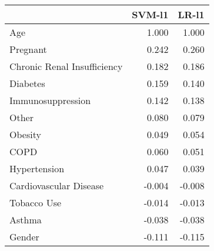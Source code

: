 \begin{tabular}{lrr}
\toprule
{} &  SVM-l1 &  LR-l1 \\
\midrule
Age                         &   1.000 &  1.000 \\
Pregnant                    &   0.242 &  0.260 \\
Chronic Renal Insufficiency &   0.182 &  0.186 \\
Diabetes                    &   0.159 &  0.140 \\
Immunosuppression           &   0.142 &  0.138 \\
Other                       &   0.080 &  0.079 \\
Obesity                     &   0.049 &  0.054 \\
COPD                        &   0.060 &  0.051 \\
Hypertension                &   0.047 &  0.039 \\
Cardiovascular Disease      &  -0.004 & -0.008 \\
Tobacco Use                 &  -0.014 & -0.013 \\
Asthma                      &  -0.038 & -0.038 \\
Gender                      &  -0.111 & -0.115 \\
\bottomrule
\end{tabular}
